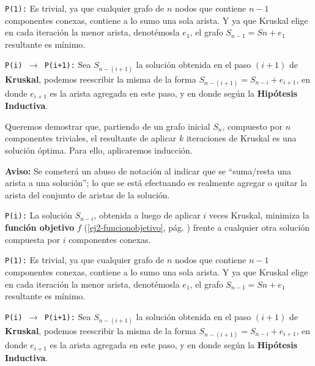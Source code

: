 \documentclass[11pt, a4paper, twoside]{article}
\begin{document}
\texttt{P(1):} Es trivial, ya que cualquier grafo de $n$ nodos que contiene
${n-1}$ componentes conexas, contiene a lo sumo una sola arista. 
Y ya que Kruskal elige en cada iteración la menor arista,
denotémosla $e_{1}$, el grafo $S_{n-1} = S{n} + e_{1}$ resultante es mínimo.

\texttt{P(i) $\rightarrow$ P(i+1):}
Sea $S_{n-(i+1)}$ la solución obtenida en el paso $(i+1)$ de \textbf{Kruskal},
podemos reescribir la misma de la forma $S_{n-(i+1)} = S_{n-i} + e_{i+1}$, en
donde $e_{i+1}$ es la arista agregada en este paso, y en donde  según la \textbf{Hipótesis Inductiva}.



Queremos demostrar que, partiendo de un grafo inicial $S_{n}$, compuesto por $n$ componentes
triviales, el resultante de aplicar $k$ iteraciones de Kruskal es una solución óptima. 
Para ello, aplicaremos inducción.

\textbf{Aviso:} Se cometerá un abuso de notación al indicar que se
``suma/resta una arista a una solución''; lo que se está efectuando es
realmente agregar o quitar la arista del conjunto de aristas de la solución.

\texttt{P(i):} La solución $S_{n-i}$, obtenida a luego de aplicar $i$ veces Kruskal,
minimiza la \textbf{función objetivo} $f$
(\ref{ej2-funcionobjetivo}, pág. \pageref{ej2-funcionobjetivo})
frente a cualquier otra solución compuesta por $i$ componentes conexas.

\texttt{P(1):} Es trivial, ya que cualquier grafo de $n$ nodos que contiene
${n-1}$ componentes conexas, contiene a lo sumo una sola arista. 
Y ya que Kruskal elige en cada iteración la menor arista,
denotémosla $e_{1}$, el grafo $S_{n-1} = S{n} + e_{1}$ resultante es mínimo.

\texttt{P(i) $\rightarrow$ P(i+1):}
Sea $S_{n-(i+1)}$ la solución obtenida en el paso $(i+1)$ de \textbf{Kruskal},
podemos reescribir la misma de la forma $S_{n-(i+1)} = S_{n-i} + e_{i+1}$, en
donde $e_{i+1}$ es la arista agregada en este paso, y en donde  según la \textbf{Hipótesis Inductiva}.

\end{document}
